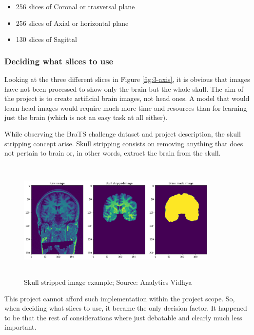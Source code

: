 \begin{itemize}
    \item 256 slices of Coronal or trasversal plane 
    \item 256 slices of Axial or horizontal plane
    \item 130 slices of Sagittal
\end{itemize}

\subsubsection*{Deciding what slices to use}

Looking at the three different slices in Figure \ref{fig:3-axis}, it is obvious that images have not been processed to show only the brain but the whole skull. The aim of the project is to create artificial brain images, not head ones. A model that would learn head images would require much more time and resources than for learning just the brain (which is not an easy task at all either).

While observing the BraTS \cite{brats} challenge dataset and project description, the skull stripping concept arise. Skull stripping consists on removing anything that does not pertain to brain or, in other words, extract the brain from the skull. 

\begin{figure}[ht]
    \centering
    \includegraphics[width = 10cm, height = 6cm]{images/skull-stripped.png}
    \caption[]{Skull stripped image example; Source: Analytics Vidhya \cite{skullstripping} }
    \label{fig:skullstripped}
\end{figure}

This project cannot afford such implementation within the project scope. So, when deciding what slices to use, it became the only decision factor. It happened to be that the rest of considerations where just debatable and clearly much less important.

